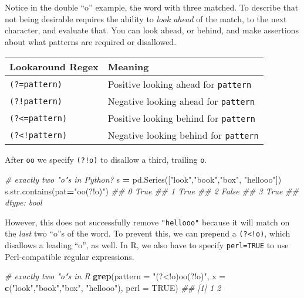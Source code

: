 \documentclass[12pt,krantz2]{krantz}
\makeatletter
\newenvironment{Shaded}{\begin{snugshade}}{\end{snugshade}}
\newcommand{\BuiltInTok}[1]{#1}
\newcommand{\CommentTok}[1]{\textcolor[rgb]{0.37,0.37,0.37}{\textit{#1}}}
\newcommand{\DataTypeTok}[1]{\textcolor[rgb]{0.27,0.27,0.27}{#1}}
\newcommand{\KeywordTok}[1]{\textcolor[rgb]{0.27,0.27,0.27}{\textbf{#1}}}
\newcommand{\NormalTok}[1]{#1}
\newcommand{\OperatorTok}[1]{\textcolor[rgb]{0.43,0.43,0.43}{\textbf{#1}}}
\newcommand{\OtherTok}[1]{\textcolor[rgb]{0.37,0.37,0.37}{#1}}
\newcommand{\StringTok}[1]{\textcolor[rgb]{0.5,0.5,0.5}{#1}}
\newenvironment{kframe}{%
\medskip{}
\setlength{\fboxsep}{.8em}
 \def\at@end@of@kframe{}%
 \ifinner\ifhmode%
  \def\at@end@of@kframe{\end{minipage}}%
  \begin{minipage}{\columnwidth}%
 \fi\fi%
 \def\FrameCommand##1{\hskip\@totalleftmargin \hskip-\fboxsep
 \colorbox{shadecolor}{##1}\hskip-\fboxsep
     \hskip-\linewidth \hskip-\@totalleftmargin \hskip\columnwidth}%
 \MakeFramed {\advance\hsize-\width
   \@totalleftmargin\z@ \linewidth\hsize
   \@setminipage}}%
 {\par\unskip\endMakeFramed%
 \at@end@of@kframe}
\renewenvironment{Shaded}{\begin{kframe}}{\end{kframe}}
\makeatother
\begin{document}
Notice in the double ``o'' example, the word with three matched. To describe that not being desirable requires the ability to \emph{look ahead} of the match, to the next character, and evaluate that. You can look ahead, or behind, and make assertions about what patterns are required or disallowed.

\begin{longtable}[]{@{}ll@{}}
\toprule
Lookaround Regex & Meaning\tabularnewline
\midrule
\endhead
\texttt{(?=pattern)} & Positive looking ahead for \texttt{pattern}\tabularnewline
\texttt{(?!pattern)} & Negative looking ahead for \texttt{pattern}\tabularnewline
\texttt{(?\textless{}=pattern)} & Positive looking behind for \texttt{pattern}\tabularnewline
\texttt{(?\textless{}!pattern)} & Negative looking behind for \texttt{pattern}\tabularnewline
\bottomrule
\end{longtable}

After \texttt{oo} we specify \texttt{(?!o)} to disallow a third, trailing \texttt{o}.

\begin{Shaded}
\begin{Highlighting}[]
\CommentTok{# exactly two "o"s in Python?}
\NormalTok{s }\OperatorTok{=}\NormalTok{ pd.Series([}\StringTok{"look"}\NormalTok{,}\StringTok{"book"}\NormalTok{,}\StringTok{"box"}\NormalTok{, }\StringTok{"hellooo"}\NormalTok{])}
\NormalTok{s.}\BuiltInTok{str}\NormalTok{.contains(pat}\OperatorTok{=}\StringTok{"oo(?!o)"}\NormalTok{)}
\CommentTok{## 0     True}
\CommentTok{## 1     True}
\CommentTok{## 2    False}
\CommentTok{## 3     True}
\CommentTok{## dtype: bool}
\end{Highlighting}
\end{Shaded}

However, this does not successfully remove \texttt{"hellooo"} because it will match on the \emph{last} two ``o''s of the word. To prevent this, we can prepend a \texttt{(?\textless{}!o)}, which disallows a leading ``o'', as well. In R, we also have to specify \texttt{perl=TRUE} to use Perl-compatible regular expressions.

\begin{Shaded}
\begin{Highlighting}[]
\CommentTok{# exactly two "o"s in R}
\KeywordTok{grep}\NormalTok{(}\DataTypeTok{pattern =} \StringTok{"(?<!o)oo(?!o)"}\NormalTok{, }
     \DataTypeTok{x =} \KeywordTok{c}\NormalTok{(}\StringTok{"look"}\NormalTok{,}\StringTok{"book"}\NormalTok{,}\StringTok{"box"}\NormalTok{, }\StringTok{"hellooo"}\NormalTok{), }\DataTypeTok{perl =} \OtherTok{TRUE}\NormalTok{)}
\CommentTok{## [1] 1 2}
\end{Highlighting}
\end{Shaded}
\end{document}
